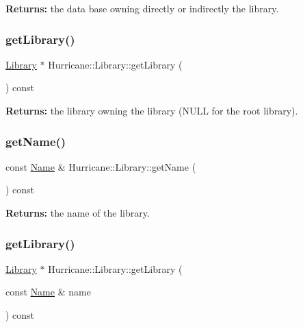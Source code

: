 {\bfseries Returns\+:} the data base owning directly or indirectly the library. \mbox{\label{classHurricane_1_1Library_a5299d19afc96c535d557b86ba42eaa82}} 
\subsubsection{\texorpdfstring{get\+Library()}{getLibrary()}\hspace{0.1cm}{\footnotesize\ttfamily [1/2]}}
{\footnotesize\ttfamily \mbox{\hyperlink{classHurricane_1_1Library}{Library}} $\ast$ Hurricane\+::\+Library\+::get\+Library (\begin{DoxyParamCaption}{ }\end{DoxyParamCaption}) const\hspace{0.3cm}{\ttfamily [inline]}}

{\bfseries Returns\+:} the library owning the library (N\+U\+LL for the root library). \mbox{\label{classHurricane_1_1Library_a13a9c4d0c43e2e1df09b7c0ee59f577f}} 
\subsubsection{\texorpdfstring{get\+Name()}{getName()}}
{\footnotesize\ttfamily const \mbox{\hyperlink{classHurricane_1_1Name}{Name}} \& Hurricane\+::\+Library\+::get\+Name (\begin{DoxyParamCaption}{ }\end{DoxyParamCaption}) const\hspace{0.3cm}{\ttfamily [inline]}}

{\bfseries Returns\+:} the name of the library. \mbox{\label{classHurricane_1_1Library_a8589e1ff3db5ef288c3027ceef28636b}} 
\subsubsection{\texorpdfstring{get\+Library()}{getLibrary()}\hspace{0.1cm}{\footnotesize\ttfamily [2/2]}}
{\footnotesize\ttfamily \mbox{\hyperlink{classHurricane_1_1Library}{Library}} $\ast$ Hurricane\+::\+Library\+::get\+Library (\begin{DoxyParamCaption}\item[{const \mbox{\hyperlink{classHurricane_1_1Name}{Name}} \&}]{name }\end{DoxyParamCaption}) const\hspace{0.3cm}{\ttfamily [inline]}}

